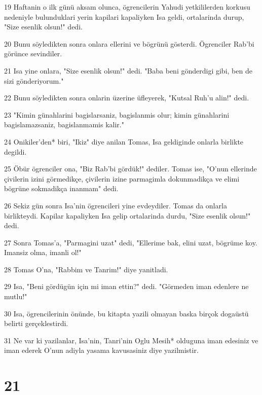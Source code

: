 \par 19 Haftanin o ilk günü aksam olunca, ögrencilerin Yahudi yetkililerden korkusu nedeniyle bulunduklari yerin kapilari kapaliyken Isa geldi, ortalarinda durup, "Size esenlik olsun!" dedi.
\par 20 Bunu söyledikten sonra onlara ellerini ve bögrünü gösterdi. Ögrenciler Rab'bi görünce sevindiler.
\par 21 Isa yine onlara, "Size esenlik olsun!" dedi. "Baba beni gönderdigi gibi, ben de sizi gönderiyorum."
\par 22 Bunu söyledikten sonra onlarin üzerine üfleyerek, "Kutsal Ruh'u alin!" dedi.
\par 23 "Kimin günahlarini bagislarsaniz, bagislanmis olur; kimin günahlarini bagislamazsaniz, bagislanmamis kalir."
\par 24 Onikiler'den* biri, "Ikiz" diye anilan Tomas, Isa geldiginde onlarla birlikte degildi.
\par 25 Öbür ögrenciler ona, "Biz Rab'bi gördük!" dediler. Tomas ise, "O'nun ellerinde çivilerin izini görmedikçe, çivilerin izine parmagimla dokunmadikça ve elimi bögrüne sokmadikça inanmam" dedi.
\par 26 Sekiz gün sonra Isa'nin ögrencileri yine evdeydiler. Tomas da onlarla birlikteydi. Kapilar kapaliyken Isa gelip ortalarinda durdu, "Size esenlik olsun!" dedi.
\par 27 Sonra Tomas'a, "Parmagini uzat" dedi, "Ellerime bak, elini uzat, bögrüme koy. Imansiz olma, imanli ol!"
\par 28 Tomas O'na, "Rabbim ve Tanrim!" diye yanitladi.
\par 29 Isa, "Beni gördügün için mi iman ettin?" dedi. "Görmeden iman edenlere ne mutlu!"
\par 30 Isa, ögrencilerinin önünde, bu kitapta yazili olmayan baska birçok dogaüstü belirti gerçeklestirdi.
\par 31 Ne var ki yazilanlar, Isa'nin, Tanri'nin Oglu Mesih* olduguna iman edesiniz ve iman ederek O'nun adiyla yasama kavusasiniz diye yazilmistir.

\chapter{21}

